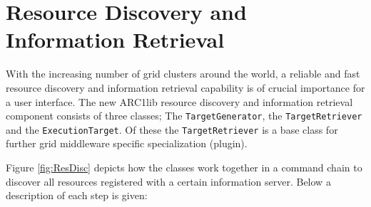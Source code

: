 \documentclass{book}
\newcommand{\TargetGenerator}{\texttt{TargetGenerator}}
\newcommand{\TargetRetriever}{\texttt{TargetRetriever}}
\newcommand{\ExecutionTarget}{\texttt{ExecutionTarget}}
\begin{document}
\section{Resource Discovery and Information Retrieval}
\label{sec:TargetDiscovery}
With the increasing number of grid clusters around the world, a reliable and fast resource discovery and 
information retrieval capability is of crucial importance for a user interface. The new ARC1lib resource 
discovery and information retrieval component consists of three classes; The {\TargetGenerator}, the 
{\TargetRetriever} and the {\ExecutionTarget}. Of these the {\TargetRetriever} is a base class for further grid 
middleware specific specialization (plugin).

Figure \ref{fig:ResDisc} depicts how the classes work together in a command chain to discover all resources 
registered with a certain information server. Below a description of each step is given:

\begin{figure}[ht]
\end{figure}
\end{document}
